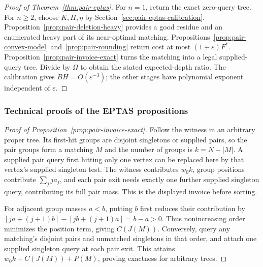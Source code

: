 

\begin{proof}[Proof of Theorem~\ref{thm:pair-eptas}]
For $n=1$, return the exact zero-query tree. For $n\ge2$, choose
$K,H,\eta$ by Section~\ref{sec:pair-eptas-calibration}.
Proposition~\ref{prop:pair-deletion-heavy} provides a good residue and
an enumerated heavy part of its near-optimal matching.
Propositions~\ref{prop:pair-convex-model} and~\ref{prop:pair-rounding}
return cost at most $(1+\varepsilon)F^*$.
Proposition~\ref{prop:pair-invoice-exact} turns the matching into a
legal supplied-query tree. Divide by $\Omega$ to obtain the stated
expected-depth ratio. The calibration gives $BH=O(\varepsilon^{-3})$;
the other stages have polynomial exponent independent of $\varepsilon$.
\end{proof}

\subsubsection{Technical proofs of the EPTAS propositions}

\begin{proof}[Proof of Proposition~\ref{prop:pair-invoice-exact}]
Follow the witness in an arbitrary proper tree. Its first-hit groups
are disjoint singletons or supplied pairs, so the pair groups form
a matching $M$ and the number of groups is $k=N-|M|$. A supplied pair
query first hitting only one vertex can be replaced here
by that vertex's supplied singleton test. The witness contributes
$w_0k$, group positions contribute $\sum_j j a_j$, and each pair
exit needs exactly one further supplied singleton query, contributing
its full pair mass. This is the displayed invoice before sorting.

For adjacent group masses $a<b$, putting $b$ first reduces their
contribution by
$[ja+(j+1)b]-[jb+(j+1)a]=b-a>0$. Thus nonincreasing order minimizes
the position term, giving $C(J(M))$. Conversely, query any matching's
disjoint pairs and unmatched singletons in that order, and attach
one supplied singleton query at each pair exit. This attains
$w_0k+C(J(M))+P(M)$, proving exactness for arbitrary trees.

\end{proof}

